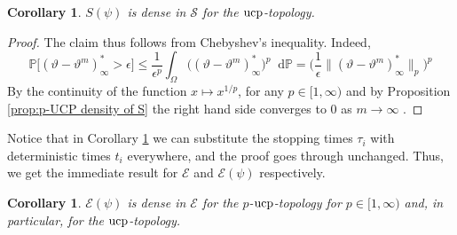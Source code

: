 \documentclass[11pt,a4paper,twoside,openany]{report}
\numberwithin{equation}{section}
\newcommand{\diff}{\mathop{}\!\mathrm{d}}
\theoremstyle{plain} %
\newtheorem{corollary}[theorem]{Corollary}
\theoremstyle{definition} %
\theoremstyle{remark} %
\begin{document}
\begin{corollary}\label{cor:p-UCP density of S}
    \(S(\psi)\) is dense in \(\mathcal{S}\) for the \(\rm{ucp}\)-topology.
\end{corollary}
\begin{proof}
   The claim thus follows from Chebyshev's inequality. Indeed,
    \begin{equation*}
        \mathbb{P}\big[(\vartheta-\vartheta^m)_{\infty}^*>\epsilon\big]\leq\frac{1}{\epsilon^p}\int_{\Omega}\big((\vartheta-\vartheta^m)_{\infty}^*\big)^p\diff \mathbb{P}=\bigg(\frac{1}{\epsilon}\lVert (\vartheta-\vartheta^m)_{\infty}^*\rVert_p\bigg)^p
    \end{equation*}
By the continuity of the function \(x\mapsto x^{1/p}\), for any \(p\in[1,\infty)\) and by Proposition \ref{prop:p-UCP density of S} the right hand side converges to \(0\) as \(m\to\infty\) .  
\end{proof}

Notice that in Corollary \ref{cor:p-UCP density of S} we can substitute the stopping times \(\tau_i\) with deterministic times \(t_i\) everywhere, and the proof goes through unchanged. Thus, we get the immediate result for \(\mathcal{E}\) and \(\mathcal{E}(\psi)\) respectively.
\begin{corollary}\label{cor:UCP and p-UCP density of E}
    \(\mathcal{E}(\psi)\) is dense in \(\mathcal{E}\) for the \(p\)-\(\rm{ucp}\)-topology for \(p\in[1,\infty)\) and, in particular, for the \(\rm{ucp}\)-topology.
\end{corollary}
\end{document}
